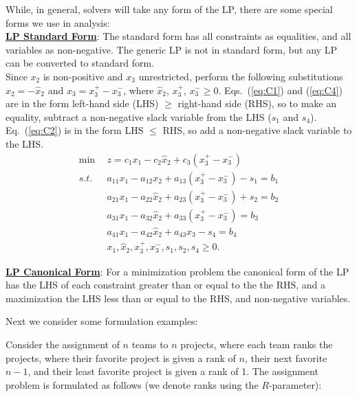 While, in general, solvers will take any form of the LP, there are some special forms we use in analysis:\\

\medskip \underline{\bf LP Standard Form}: The standard form has all constraints as equalities, and all variables as non-negative.  The generic LP is not in standard form, but any LP can be converted to standard form. \\

Since $x_2$ is non-positive and $x_3$ unrestricted, perform the following substitutions $x_2=-\hat{x}_2$ and $x_3 = x_3^+ -x_3^-$, where $\hat{x}_2$, $x_3^+$, $x_3^- \ge 0$.   Eqs.~(\ref{eq:C1}) and (\ref{eq:C4}) are in the form left-hand side (LHS) $\ge$ right-hand side (RHS), so to make an equality, subtract a non-negative slack variable from the LHS ($s_1$ and $s_4$).  Eq.~(\ref{eq:C2}) is in the form LHS $\le$ RHS, so add a non-negative slack variable to the LHS.
\begin{align*}
\min \ \ & z = c_1x_1 - c_2\hat{x}_2 + c_3 (x_3^+ -x_3^-)  \\
s.t. \ \  & a_{11}x_1 - a_{12}x_2 + a_{13} (x_3^+ -x_3^-) - s_1 = b_1 \\
& a_{21}x_1 - a_{22}\hat{x}_2 + a_{23} (x_3^+ -x_3^-) + s_2 = b_2 \\
&  a_{31}x_1 - a_{32}\hat{x}_2 + a_{33} (x_3^+ -x_3^-) = b_3 \\
& a_{41}x_1 - a_{42}\hat{x}_2 + a_{43} x_3 - s_4 = b_4 \\
& x_1, \hat{x}_2, x_3^+, x_3^-, s_1, s_2, s_4 \ge 0.
\end{align*}

\medskip \underline{\bf  LP Canonical Form}: For a minimization problem the canonical form of the LP has the LHS of each constraint greater than or equal to the the RHS, and a maximization the LHS less than or equal to the RHS, and non-negative variables.

Next we consider some formulation examples:


 Consider the assignment of $n$ teams to $n$ projects, where each team ranks the projects, where their favorite project is given a rank of $n$, their next favorite $n-1$, and their least favorite project is given a rank of 1.  The assignment problem is formulated as follows (we denote ranks using the $R$-parameter):

